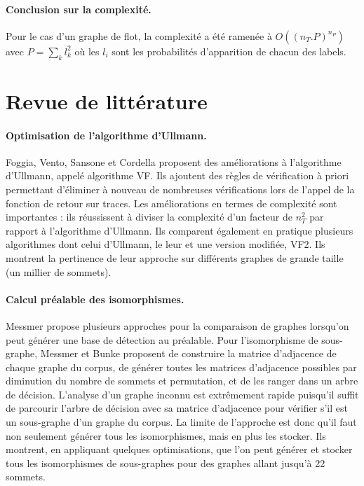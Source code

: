 \paragraph{Conclusion sur la complexité.} 
Pour le cas d'un graphe de flot, la complexité a été ramenée à $O((n_T.P)^{n_P})$ avec $P=\sum_kl_k^2$ où les $l_i$ sont les probabilités d'apparition de chacun des labels.

\section{Revue de littérature}
\paragraph{Optimisation de l'algorithme d'Ullmann.}
Foggia, Vento, Sansone et Cordella \cite{VF99} proposent des améliorations à l'algorithme d'Ullmann, appelé algorithme VF.
Ils ajoutent des règles de vérification à priori permettant d'éliminer à nouveau de nombreuses vérifications lors de l'appel de la fonction de retour sur traces.
Les améliorations en termes de complexité sont importantes : ils réussissent à diviser la complexité d'un facteur de $n_T^2$ par rapport à l'algorithme d'Ullmann.
Ils comparent également en pratique plusieurs algorithmes \cite{FSV01} dont celui d'Ullmann, le leur et une version modifiée, VF2. Ils montrent la pertinence de leur approche sur différents graphes de grande taille (un millier de sommets).

\paragraph{Calcul préalable des isomorphismes.}
Messmer \cite{MessPhd} propose plusieurs approches pour la comparaison de graphes lorsqu'on peut générer une base de détection au préalable.
Pour l'isomorphisme de sous-graphe, Messmer et Bunke proposent \cite{MB95} de construire la matrice d'adjacence de chaque graphe du corpus, de générer toutes les matrices d'adjacence possibles par diminution du nombre de sommets et permutation, et de les ranger dans un arbre de décision.
L'analyse d'un graphe inconnu est extrêmement rapide puisqu'il suffit de parcourir l'arbre de décision avec sa matrice d'adjacence pour vérifier s'il est un sous-graphe d'un graphe du corpus.
La limite de l'approche est donc qu'il faut non seulement générer tous les isomorphismes, mais en plus les stocker.
Ils montrent, en appliquant quelques optimisations, que l'on peut générer et stocker tous les isomorphismes de sous-graphes pour des graphes allant jusqu'à 22 sommets.
\\

